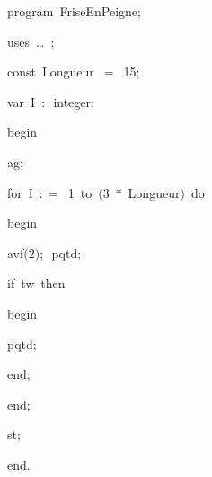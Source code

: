 
{
\parindent {}
\medskip

\carrenoir
\vspace{\neglskip}\mbox{\blc  \idt  \mcl program\idt\ FriseEnPeigne$;$
}\par 
\vspace{\neglskip}\mbox{\blc \blk\idt \mcl uses\idt \ \ldots\ $;$
}\par 
\pagebreak[3] 
\vspace{\neglskip}\mbox{\blc  \blk\idt  \mcl const\idt \ Longueur\ $=$\ 15$;$}\par 
\pagebreak[3] 
\vspace{\neglskip}\mbox{\blc  \blk\idt  \mcl var\idt \ I\ $:$\ integer$;$}\par 
\vspace{\neglskip}\mbox{\blc  \idt  \mcl begin\idt }\par 
\vspace{\neglskip}\mbox{\blc  \blk\idt  ag$;$}\par 
\pagebreak[3] 
\vspace{\neglskip}\mbox{\blc  \blk\idt  \mcl for\idt \ I\ $:$$=$\ 1\ \mcl to\idt \ $($3\ $\ast$\ Longueur$)$\ \mcl do\idt }\par 
\vspace{\neglskip}\mbox{\blc  \blk\blk\idt  \mcl begin\idt }\par 
\vspace{\neglskip}\mbox{\blc  \blk\blk\blk\idt  avf$($2$)$$;$\ pqtd$;$\ }\par 
\pagebreak[3] 
\vspace{\neglskip}\mbox{\blc  \blk\blk\blk\idt  \mcl if\idt \ tw\ \mcl then\idt }\par 
\vspace{\neglskip}\mbox{\blc  \blk\blk\blk\blk\idt  \mcl begin\idt }\par 
\vspace{\neglskip}\mbox{\blc  \blk\blk\blk\blk\blk\idt  pqtd$;$\ }\par 
\vspace{\neglskip}\mbox{\blc  \blk\blk\blk\blk\idt  \mcl end\idt $;$}\par 
\vspace{\neglskip}\mbox{\blc  \blk\blk\idt  \mcl end\idt $;$}\par 
\vspace{\neglskip}\mbox{\blc  \blk\idt  st$;$}\par 
\vspace{\neglskip}\mbox{\blc  \idt  \mcl end\idt $.$}\par 

\medskip }

